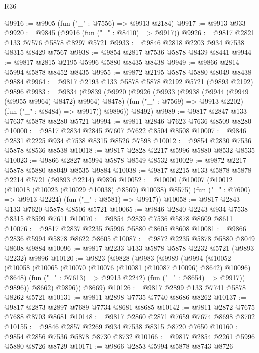 \begin{lexlean}{R36}
\begin{coremodule}
@9916 := @9905 (fun ("_" : @7556) => @9913 @2184)
@9917 := @9913 @933
@9920 := @9845 (@9916 (fun ("_" : @8410) => @9917))
@9926 := @9817 @2821 @133 @7576 @5878 @8297 @5721
@9933 := @9846 @2818 @2203 @934 @7538 @8315 @8429 @7567
@9938 := @9854 @2817 @7536 @5878 @8439 @8441
@9944 := @9817 @2815 @2195 @5996 @5880 @8435 @8438
@9949 := @9866 @2814 @5994 @5878 @8452 @8435
@9955 := @9872 @2195 @5878 @5880 @8049 @8438 @9884
@9964 := @9817 @2193 @133 @5878 @5878 @2192 @5721 (@9893 @2192) @9896
@9983 := @9834
    (@9839
      (@9920
        (@9926
          (@9933
            (@9938 (@9944 (@9949 (@9955 @9964) @8472) @9964) @8478)
            (fun ("_" : @7569) => @9913 @2202)
            (fun ("_" : @8484) => @9917))
          @9896))
      @8492)
@9989 := @9817 @2847 @133 @7637 @5878 @8280 @5721
@9994 := @9811 @2846 @7623 @7636 @8509 @8280
@10000 := @9817 @2834 @2845 @7607 @7622 @8504 @8508
@10007 := @9846 @2831 @2225 @934 @7538 @8315 @8526 @7598
@10012 := @9854 @2830 @7536 @5878 @8536 @8538
@10018 := @9817 @2828 @2217 @5996 @5880 @8532 @8535
@10023 := @9866 @2827 @5994 @5878 @8549 @8532
@10029 := @9872 @2217 @5878 @5880 @8049 @8535 @9884
@10038 := @9817 @2215 @133 @5878 @5878 @2214 @5721 (@9893 @2214) @9896
@10052 := @10000
    (@10007
      (@10012 (@10018 (@10023 (@10029 @10038) @8569) @10038) @8575)
      (fun ("_" : @7600) => @9913 @2224)
      (fun ("_" : @8581) => @9917))
@10058 := @9817 @2843 @133 @7620 @5878 @8506 @5721
@10065 := @9846 @2840 @2243 @934 @7538 @8315 @8599 @7611
@10070 := @9854 @2839 @7536 @5878 @8609 @8611
@10076 := @9817 @2837 @2235 @5996 @5880 @8605 @8608
@10081 := @9866 @2836 @5994 @5878 @8622 @8605
@10087 := @9872 @2235 @5878 @5880 @8049 @8608 @9884
@10096 := @9817 @2233 @133 @5878 @5878 @2232 @5721 (@9893 @2232) @9896
@10120 := @9823
    (@9828
      (@9983
        (@9989
          (@9994
            (@10052
              (@10058
                (@10065
                  (@10070 (@10076 (@10081 (@10087 @10096) @8642) @10096) @8648)
                  (fun ("_" : @7613) => @9913 @2242)
                  (fun ("_" : @8654) => @9917))
                @9896))
            @8662)
          @9896))
      @8669)
@10126 := @9817 @2899 @133 @7741 @5878 @8262 @5721
@10131 := @9811 @2898 @7735 @7740 @8686 @8262
@10137 := @9817 @2873 @2897 @7689 @7734 @8681 @8685
@10142 := @9811 @2872 @7675 @7688 @8703 @8681
@10148 := @9817 @2860 @2871 @7659 @7674 @8698 @8702
@10155 := @9846 @2857 @2269 @934 @7538 @8315 @8720 @7650
@10160 := @9854 @2856 @7536 @5878 @8730 @8732
@10166 := @9817 @2854 @2261 @5996 @5880 @8726 @8729
@10171 := @9866 @2853 @5994 @5878 @8743 @8726

\end{coremodule}
\end{lexlean}

